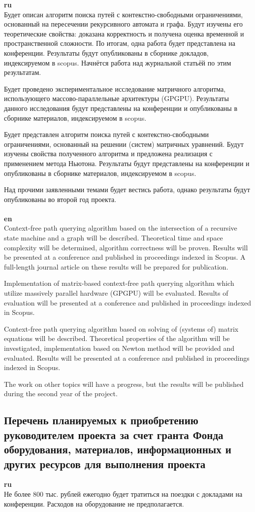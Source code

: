 \documentclass[12pt]{article}  %
\theoremstyle{remark}
\begin{document}
\textbf{ru}\\
%
Будет описан алгоритм поиска путей с контекстно-свободными ограничениями, основанный на пересечении рекурсивного автомата и графа. Будут изучены его теоретические свойства: доказана корректность и получена оценка временной и пространственной сложности.
По итогам, одна работа будет представлена на конференции. Результаты будут опубликованы в сборнике докладов, индексируемом в scopus.
Начнётся работа над журнальной статьёй по этим результатам.

Будет проведено экспериментальное исследование матричного алгоритма, использующего массово-параллельные архитектуры (GPGPU).
Результаты данного исследования будут представлены на конференции и опубликованы в сборнике материалов, индексируемом в scopus.

Будет представлен алгоритм поиска путей с контекстно-свободными ограничениями, основанный на решении (систем) матричных уравнений.
Будут изучены свойства полученного алгоритма и предложена реализация с применением метода Ньютона.
Результаты будут представлены на конференции и опубликованы в сборнике материалов, индексируемом в scopus.

Над прочими заявленными темами будет вестись работа, однако результаты будут опубликованы во второй год проекта.
\\
\\
\textbf{en}\\
Context-free path querying algorithm based on the intersection of a recursive state machine and a graph will be described.
Theoretical time and space complexity will be determined, algorithm correctness will be proven.
Results will be presented at a conference and published in proceedings indexed in Scopus.
A full-length journal article on these results will be prepared for publication.

Implementation of matrix-based context-free path querying algorithm which utilize massively parallel hardware (GPGPU) will be evaluated.
Results of evaluation will be presented at a conference and published in proceedings indexed in Scopus.

Context-free path querying algorithm based on solving of (systems of) matrix equations will be described.
Theoretical properties of the algorithm will be investigated, implementation based on Newton method will be provided and evaluated.
Results will be presented at a conference and published in proceedings indexed in Scopus.

The work on other topics will have a progress, but the results will be published during the second year of the project.

\subsection{Перечень планируемых к приобретению руководителем проекта за счет гранта Фонда оборудования, материалов, информационных и других ресурсов для выполнения проекта}

\textbf{ru}\\
%
Не более 800 тыс. рублей ежегодно будет тратиться на поездки с докладами на конференции. Расходов на оборудование не предполагается.
\end{document}
